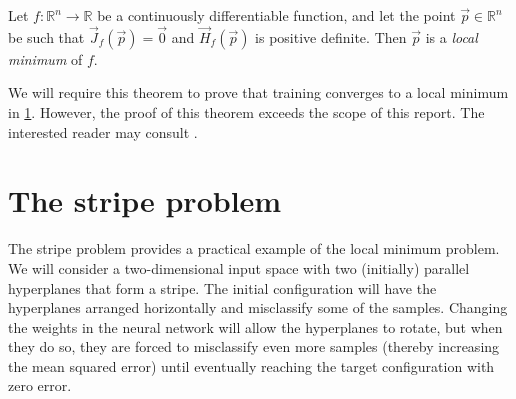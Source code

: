\begin{theorem}
    Let $f: \mathbb{R}^n \rightarrow \mathbb{R}$ be a continuously differentiable function, and let the point
    $\vec{p} \in \mathbb{R}^n$
    be such that
    $\vec{J}_f(\vec{p}) = \vec{0}$
    and
    $\vec{H}_f(\vec{p})$ is positive definite.
    Then $\vec{p}$ is a \textit{local minimum} of $f$.
\end{theorem}
We will require this theorem to prove that training converges to a local minimum in \ref{sec:stripe_problem}.
However, the proof of this theorem exceeds the scope of this report.
The interested reader may consult \textcite[p. 190]{loomis1990}.


\section{The stripe problem}
\label{sec:stripe_problem}
The stripe problem provides a practical example of the local minimum problem. 
We will consider a two-dimensional input space with two (initially) parallel hyperplanes that form a stripe.
The initial configuration will have the hyperplanes arranged horizontally and misclassify some of the samples. 
Changing the weights in the neural network will allow the hyperplanes to rotate, but when they do so, they are forced to misclassify even more samples (thereby increasing the mean squared error) until eventually reaching the target configuration with zero error.

